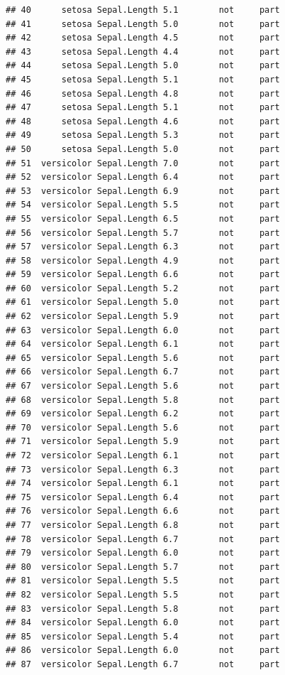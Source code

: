 \documentclass[krantz2]{krantz}\usepackage{knitr}%
\begin{document}
\begin{knitrout}
\begin{kframe}
\begin{verbatim}
## 40      setosa Sepal.Length 5.1        not     part
## 41      setosa Sepal.Length 5.0        not     part
## 42      setosa Sepal.Length 4.5        not     part
## 43      setosa Sepal.Length 4.4        not     part
## 44      setosa Sepal.Length 5.0        not     part
## 45      setosa Sepal.Length 5.1        not     part
## 46      setosa Sepal.Length 4.8        not     part
## 47      setosa Sepal.Length 5.1        not     part
## 48      setosa Sepal.Length 4.6        not     part
## 49      setosa Sepal.Length 5.3        not     part
## 50      setosa Sepal.Length 5.0        not     part
## 51  versicolor Sepal.Length 7.0        not     part
## 52  versicolor Sepal.Length 6.4        not     part
## 53  versicolor Sepal.Length 6.9        not     part
## 54  versicolor Sepal.Length 5.5        not     part
## 55  versicolor Sepal.Length 6.5        not     part
## 56  versicolor Sepal.Length 5.7        not     part
## 57  versicolor Sepal.Length 6.3        not     part
## 58  versicolor Sepal.Length 4.9        not     part
## 59  versicolor Sepal.Length 6.6        not     part
## 60  versicolor Sepal.Length 5.2        not     part
## 61  versicolor Sepal.Length 5.0        not     part
## 62  versicolor Sepal.Length 5.9        not     part
## 63  versicolor Sepal.Length 6.0        not     part
## 64  versicolor Sepal.Length 6.1        not     part
## 65  versicolor Sepal.Length 5.6        not     part
## 66  versicolor Sepal.Length 6.7        not     part
## 67  versicolor Sepal.Length 5.6        not     part
## 68  versicolor Sepal.Length 5.8        not     part
## 69  versicolor Sepal.Length 6.2        not     part
## 70  versicolor Sepal.Length 5.6        not     part
## 71  versicolor Sepal.Length 5.9        not     part
## 72  versicolor Sepal.Length 6.1        not     part
## 73  versicolor Sepal.Length 6.3        not     part
## 74  versicolor Sepal.Length 6.1        not     part
## 75  versicolor Sepal.Length 6.4        not     part
## 76  versicolor Sepal.Length 6.6        not     part
## 77  versicolor Sepal.Length 6.8        not     part
## 78  versicolor Sepal.Length 6.7        not     part
## 79  versicolor Sepal.Length 6.0        not     part
## 80  versicolor Sepal.Length 5.7        not     part
## 81  versicolor Sepal.Length 5.5        not     part
## 82  versicolor Sepal.Length 5.5        not     part
## 83  versicolor Sepal.Length 5.8        not     part
## 84  versicolor Sepal.Length 6.0        not     part
## 85  versicolor Sepal.Length 5.4        not     part
## 86  versicolor Sepal.Length 6.0        not     part
## 87  versicolor Sepal.Length 6.7        not     part

\end{verbatim}
\end{kframe}
\end{knitrout}
\end{document}

